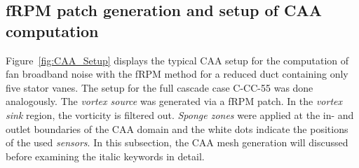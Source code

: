 \subsection{fRPM patch generation and setup of CAA computation} \label{subsec:SetupFRPMCAA}
Figure~\ref{fig:CAA_Setup} displays the typical CAA setup for the computation of fan broadband noise with the fRPM method for a reduced duct containing only five stator vanes.  The setup for the full cascade case C-CC-55 was done analogously.  The \textit{vortex source} was generated via a fRPM patch. In the \textit{vortex sink} region, the vorticity is filtered out.  \textit{Sponge zones} were applied at the in- and outlet boundaries of the CAA domain and the white dots indicate the positions of the used \textit{sensors}.  In this subsection, the CAA mesh generation will discussed before examining the italic keywords in detail.

